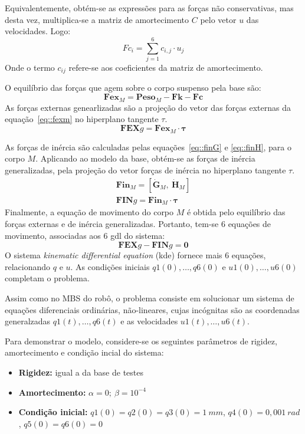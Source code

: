 Equivalentemente, obtém-se as expressões para as forças não conservativas, mas
desta vez, multiplica-se a matriz de amortecimento $C$ pelo vetor $u$ das
velocidades. Logo:
%
\begin{equation} \label{eq::fci}
	Fc_i = \sum_{j=1}^{6} c_{i,j} \cdot u_j
\end{equation}
%
Onde o termo $c_{ij}$ refere-se aos coeficientes da matriz de amortecimento.

O equilíbrio das forças que agem sobre o corpo suspenso pela base são:
%
\begin{equation} \label{eq::fexm}
	\mathbf{Fex}_M = \mathbf{Peso}_M - \mathbf{Fk} - \mathbf{Fc}
\end{equation}
%
As forças externas genearlizadas são a projeção do vetor das forças externas da
equação~\ref{eq::fexm} no hiperplano tangente $\tau$.
%
\begin{equation}
	\mathbf{FEX}g = \mathbf{Fex}_M \cdot \boldsymbol{\tau}
\end{equation}
%

As forças de inércia são calculadas pelas equações~\ref{eq::finG} e
\ref{eq::finH}, para o corpo $M$. Aplicando ao modelo da base, obtém-se as
forças de inércia generalizadas, pela projeção do vetor forças de inércia no
hiperplano tangente $\tau$.
%
\begin{gather}
	\mathbf{Fin}_M = [\dot{\mathbf{G}}_{M},~ \dot{\mathbf{H}}_{M}] \\
	\mathbf{FIN}g = \mathbf{Fin}_M \cdot \boldsymbol{\tau}
\end{gather}
%
Finalmente, a equação de movimento do corpo $M$ é obtida pelo equilíbrio das
forças externas e de inércia generalizadas. Portanto, tem-se 6 equações de
movimento, associadas aos 6 gdl do sistema:
%
\begin{equation}
	\mathbf{FEX}g - \mathbf{FIN}g = \mathbf{0}
\end{equation}
%
O sistema \textit{kinematic differential equation} (kde) fornece mais 6
equações, relacionando $q$ e $u$. As condições iniciais $q1(0),\ldots,q6(0)$ e
$u1(0),\ldots,u6(0)$ completam o problema.

Assim como no MBS do robô, o problema consiste em solucionar um sistema de
equações diferenciais ordinárias, não-lineares, cujas incógnitas são as
coordenadas generalzadas $q1(t),\ldots,q6(t)$ e as velocidades
$u1(t),\ldots,u6(t)$. 

Para demonstrar o modelo, considere-se os seguintes parâmetros de rigidez,
amortecimento e condição incial do sistema:
%
\begin{itemize}
  \item{\textbf{Rigidez:} igual a da base de testes}
  \item{\textbf{Amortecimento:} $\alpha = 0;~ \beta = 10^{-4}$}
  \item{\textbf{Condição inicial:} $q1(0) = q2(0) = q3(0) =1~mm$, $q4(0) =
  0,001~rad$, $q5(0) = q6(0) = 0$}
\end{itemize}
%


